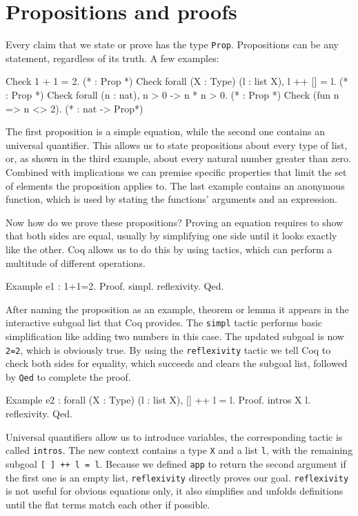 \documentclass[fleqn]{scrreprt}
\newcommand{\todo}[1]{\marginpar{\textbf{TODO:} #1}}
\newcommand{\coqinline}[1]{\texttt{#1}}
\begin{document}
\section{Propositions and proofs}
Every claim that we state or prove has the type \coqinline{Prop}. Propositions can be any statement, regardless of its truth. A few examples:
\begin{coqcode}
Check 1 + 1 = 2. (* : Prop *)
Check forall (X : Type) (l : list X), l ++ [] = l. (* : Prop *)
Check forall (n : nat), n > 0 -> n * n > 0. (* : Prop *)
Check (fun n => n <> 2). (* : nat -> Prop*)
\end{coqcode}
The first proposition is a simple equation, while the second one contains an universal quantifier. This allows us to state propositions about every type of list, or, as shown in the third example, about every natural number greater than zero. Combined with implications we can premise specific properties that limit the set of elements the proposition applies to. The last example contains an anonymous function, which is used by stating the functions' arguments and an expression.
\par
Now how do we prove these propositions? Proving an equation requires to show that both sides are equal, usually by simplifying one side until it looks exactly like the other. Coq allows us to do this by using tactics, which can perform a multitude of different operations.
\begin{coqcode}
Example e1 : 1+1=2.
Proof. simpl. reflexivity. Qed. 
\end{coqcode} 
\todo{Highlighting für Proof und Qed}
After naming the proposition as an example, theorem or lemma it appears in the interactive subgoal list that Coq provides. The \coqinline{simpl} tactic performs basic simplification like adding two numbers in this case. The updated subgoal is now \coqinline{2=2}, which is obviously true. By using the \coqinline{reflexivity} tactic we tell Coq to check both sides for equality, which succeeds and clears the subgoal list, followed by \coqinline{Qed} to complete the proof.
\begin{coqcode}
Example e2 : forall (X : Type) (l : list X), [] ++ l = l.
Proof. intros X l. reflexivity. Qed.
\end{coqcode}
Universal quantifiers allow us to introduce variables, the corresponding tactic is called \coqinline{intros}. The new context contains a type \coqinline{X} and a list \coqinline{l}, with the remaining subgoal \coqinline{[ ] ++ l = l}. Because we defined \coqinline{app} to return the second argument if the first one is an empty list, \coqinline{reflexivity} directly proves our goal. \coqinline{reflexivity} is not useful for obvious equations only, it also simplifies and unfolds definitions until the flat terms match each other if possible.
\end{document}
